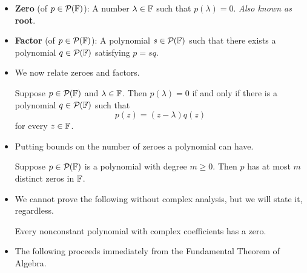 \documentclass[../main.tex]{subfiles}
\begin{document}
\begin{itemize}
\begin{theorem}
\begin{proof}
            \begin{align*}
                \dim\range T &= \dim(\pol[n-m]{\F}\times\pol[m-1]{\F})-\dim\nul T\\
                &= n+1\\
                &= \dim\pol[n]{\F}
            \end{align*}
            Thus, by Exercise \ref{exr:subspaceSameDim}, $\range T=\pol[n]{\F}$. Therefore, since $p\in\pol[n]{\F}$, we know that there exists $q\in\pol[n-m]{\F}$ and $r\in\pol[m-1]{\F}$ such that $p=T(q,r)=sq+r$.\par
            Additionally, we know that $q,r$ are unique: If there exist $q',r'$ such that $T(q',r')=p$, then $T(q-q',r-r')=p-p=0$, implying since $\nul T=\{(0,0)\}$ that $q-q'=0$ and $r-r'=0$, i.e., that $q=q'$ and $r=r'$.
        \end{proof}
    \end{theorem}
    \item \textbf{Zero} (of $p\in\mathcal{P}_{}(\mathbb{F})$): A number $\lambda\in\mathbb{F}$ such that $p(\lambda)=0$. \emph{Also known as} \textbf{root}.
    \item \textbf{Factor} (of $p\in\mathcal{P}_{}(\mathbb{F})$): A polynomial $s\in\mathcal{P}_{}(\mathbb{F})$ such that there exists a polynomial $q\in\mathcal{P}_{}(\mathbb{F})$ satisfying $p=sq$.
    \item We now relate zeroes and factors.
    \begin{theorem}
        Suppose $p\in\mathcal{P}_{}(\mathbb{F})$ and $\lambda\in\mathbb{F}$. Then $p(\lambda)=0$ if and only if there is a polynomial $q\in\mathcal{P}_{}(\mathbb{F})$ such that
        \begin{equation*}
            p(z) = (z-\lambda)q(z)
        \end{equation*}
        for every $z\in\mathbb{F}$.
    \end{theorem}
    \item Putting bounds on the number of zeroes a polynomial can have.
    \begin{theorem}
        Suppose $p\in\mathcal{P}_{}(\mathbb{F})$ is a polynomial with degree $m\geq 0$. Then $p$ has at most $m$ distinct zeros in $\mathbb{F}$.
    \end{theorem}
    \item We cannot prove the following without complex analysis, but we will state it, regardless.
    \begin{theorem}
        Every nonconstant polynomial with complex coefficients has a zero.
    \end{theorem}
    \item The following proceeds immediately from the Fundamental Theorem of Algebra.

\end{itemize}
\end{document}
